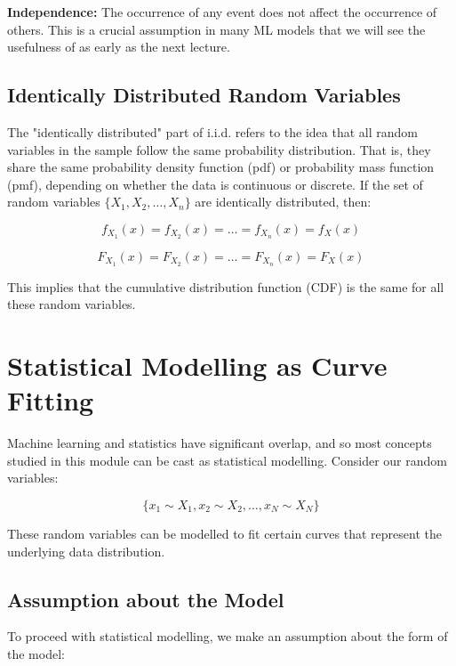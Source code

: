 \textbf{Independence:} The occurrence of any event does not affect the occurrence of others. This is a crucial assumption in many ML models that we will see the usefulness of as early as the next lecture.

\subsection{Identically Distributed Random Variables}

The "identically distributed" part of i.i.d. refers to the idea that all random variables in the sample follow the same probability distribution. That is, they share the same probability density function (pdf) or probability mass function (pmf), depending on whether the data is continuous or discrete. If the set of random variables \(\{X_1, X_2, \ldots, X_n\}\) are identically distributed, then:



\begin{equation}
    f_{X_1}(x) = f_{X_2}(x) = \ldots = f_{X_n}(x) = f_{X}(x)
\end{equation}

\begin{equation}
F_{X_1}(x) = F_{X_2}(x) = \ldots = F_{X_n}(x) = F_{X}(x)
\end{equation}

This implies that the cumulative distribution function (CDF) is the same for all these random variables.


\section{Statistical Modelling as Curve Fitting}

Machine learning and statistics have significant overlap, and so most concepts studied in this module can be cast as statistical modelling. Consider our random variables:

\[
\{x_1 \sim X_1, x_2 \sim X_2, \ldots, x_N \sim X_N\}
\]

These random variables can be modelled to fit certain curves that represent the underlying data distribution. 

\subsection{Assumption about the Model}

To proceed with statistical modelling, we make an assumption about the form of the model:


